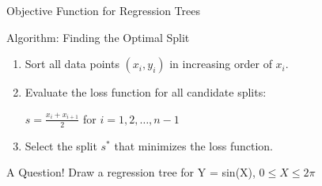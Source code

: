 \documentclass[usenames,dvipsnames]{beamer}
\begin{document}
\begin{frame}{Objective Function for Regression Trees}
\end{frame}

\begin{frame}{Algorithm: Finding the Optimal Split}
\begin{enumerate}
\item<1-> Sort all data points $(x_i, y_i)$ in increasing order of $x_i$.
\item<2-> Evaluate the loss function for all candidate splits:
\vspace{0.25cm}
\begin{center}
$s = \frac{x_i + x_{i+1}}{2}$ for $i = 1, 2, \ldots, n-1$
\end{center}
\vspace{0.25cm}
\item<2-> Select the split $s^*$ that minimizes the loss function.
\end{enumerate} 
\end{frame}


\begin{frame}{A Question!}
Draw a regression tree for Y = sin(X), $0 \leq X \leq 2\pi$ 
\end{frame}
\end{document}
